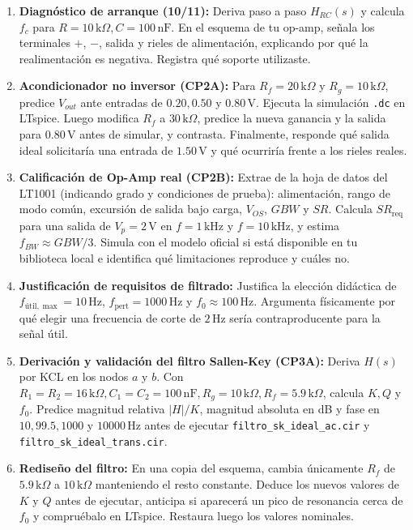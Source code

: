 \documentclass[11pt, a4paper]{article}
\begin{document}
\begin{enumerate}[label=\textbf{E\arabic*.}, start=0, leftmargin=*]
    \item \textbf{Diagnóstico de arranque (10/11):} Deriva paso a paso $H_{RC}(s)$ y calcula $f_c$ para $R=10\,\text{k}\Omega, C=100\,\text{nF}$. En el esquema de tu op-amp, señala los terminales $+$, $-$, salida y rieles de alimentación, explicando por qué la realimentación es negativa. Registra qué soporte utilizaste.
    \item \textbf{Acondicionador no inversor (CP2A):} Para $R_f = 20\,\text{k}\Omega$ y $R_g = 10\,\text{k}\Omega$, predice $V_{out}$ ante entradas de $0.20, 0.50$ y $0.80\,\text{V}$. Ejecuta la simulación \texttt{.dc} en LTspice. Luego modifica $R_f$ a $30\,\text{k}\Omega$, predice la nueva ganancia y la salida para $0.80\,\text{V}$ antes de simular, y contrasta. Finalmente, responde qué salida ideal solicitaría una entrada de $1.50\,\text{V}$ y qué ocurriría frente a los rieles reales.
    \item \textbf{Calificación de Op-Amp real (CP2B):} Extrae de la hoja de datos del LT1001 (indicando grado y condiciones de prueba): alimentación, rango de modo común, excursión de salida bajo carga, $V_{OS}$, $GBW$ y $SR$. Calcula $SR_{\text{req}}$ para una salida de $V_p = 2\,\text{V}$ en $f = 1\,\text{kHz}$ y $f = 10\,\text{kHz}$, y estima $f_{BW} \approx GBW/3$. Simula con el modelo oficial si está disponible en tu biblioteca local e identifica qué limitaciones reproduce y cuáles no.
    \item \textbf{Justificación de requisitos de filtrado:} Justifica la elección didáctica de $f_{\text{útil},\max} = 10\,\text{Hz}$, $f_{\text{pert}} = 1000\,\text{Hz}$ y $f_0 \approx 100\,\text{Hz}$. Argumenta físicamente por qué elegir una frecuencia de corte de $2\,\text{Hz}$ sería contraproducente para la señal útil.
    \item \textbf{Derivación y validación del filtro Sallen-Key (CP3A):} Deriva $H(s)$ por KCL en los nodos $a$ y $b$. Con $R_1=R_2=16\,\text{k}\Omega, C_1=C_2=100\,\text{nF}, R_g=10\,\text{k}\Omega, R_f=5.9\,\text{k}\Omega$, calcula $K, Q$ y $f_0$. Predice magnitud relativa $|H|/K$, magnitud absoluta en dB y fase en $10, 99.5, 1000$ y $10000\,\text{Hz}$ antes de ejecutar \texttt{filtro\_sk\_ideal\_ac.cir} y \texttt{filtro\_sk\_ideal\_trans.cir}.
    \item \textbf{Rediseño del filtro:} En una copia del esquema, cambia únicamente $R_f$ de $5.9\,\text{k}\Omega$ a $10\,\text{k}\Omega$ manteniendo el resto constante. Deduce los nuevos valores de $K$ y $Q$ antes de ejecutar, anticipa si aparecerá un pico de resonancia cerca de $f_0$ y compruébalo en LTspice. Restaura luego los valores nominales.

\end{enumerate}
\end{document}

